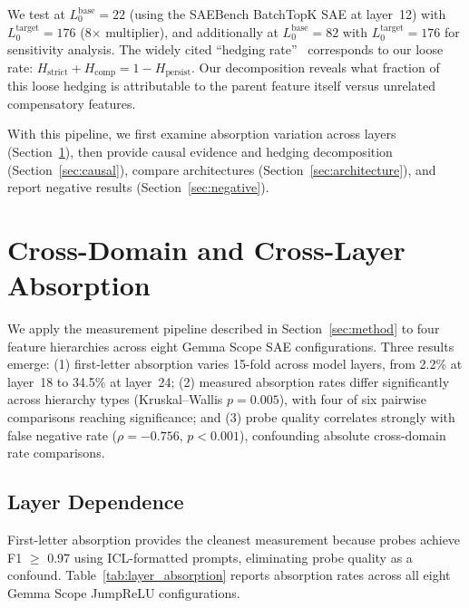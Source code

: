 \documentclass{article}
\begin{document}
We test at $L_0^{\text{base}} = 22$ (using the SAEBench BatchTopK SAE at layer~12) with $L_0^{\text{target}} = 176$ (8$\times$ multiplier), and additionally at $L_0^{\text{base}} = 82$ with $L_0^{\text{target}} = 176$ for sensitivity analysis. The widely cited ``hedging rate''~\citep{chanin2025hedging} corresponds to our loose rate: $H_{\text{strict}} + H_{\text{comp}} = 1 - H_{\text{persist}}$. Our decomposition reveals what fraction of this loose hedging is attributable to the parent feature itself versus unrelated compensatory features.

With this pipeline, we first examine absorption variation across layers (Section~\ref{sec:results}), then provide causal evidence and hedging decomposition (Section~\ref{sec:causal}), compare architectures (Section~\ref{sec:architecture}), and report negative results (Section~\ref{sec:negative}).

\section{Cross-Domain and Cross-Layer Absorption}
\label{sec:results}

We apply the measurement pipeline described in Section~\ref{sec:method} to four feature hierarchies across eight Gemma Scope SAE configurations. Three results emerge: (1) first-letter absorption varies 15-fold across model layers, from 2.2\% at layer~18 to 34.5\% at layer~24; (2) measured absorption rates differ significantly across hierarchy types (Kruskal--Wallis $p = 0.005$), with four of six pairwise comparisons reaching significance; and (3) probe quality correlates strongly with false negative rate ($\rho = -0.756$, $p < 0.001$), confounding absolute cross-domain rate comparisons.

\subsection{Layer Dependence}
\label{sec:layer}

First-letter absorption provides the cleanest measurement because probes achieve F1 $\geq$ 0.97 using ICL-formatted prompts, eliminating probe quality as a confound. Table~\ref{tab:layer_absorption} reports absorption rates across all eight Gemma Scope JumpReLU configurations.
\end{document}
